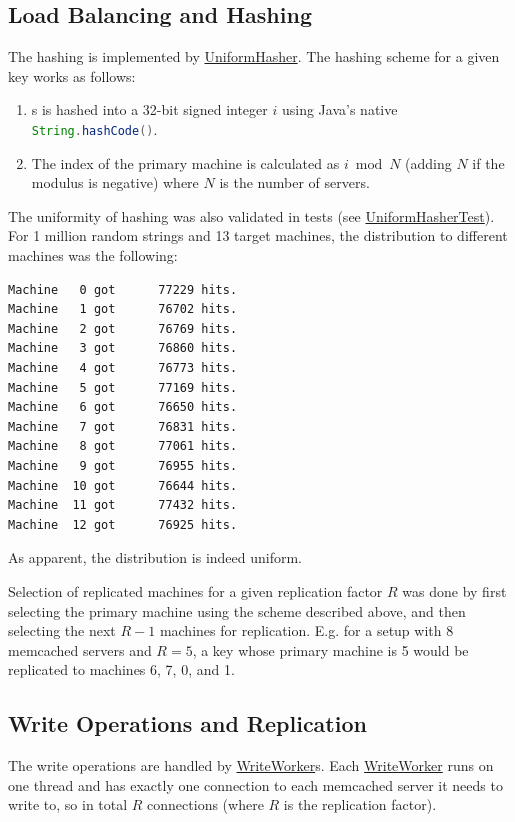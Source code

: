 \documentclass[11pt]{article}
\newcommand{\code}[1]{\lstinline[language=Java]{#1}}
\newcommand{\linkmain}[1]{\href{https://gitlab.inf.ethz.ch/pungast/asl-fall16-project/blob/master/src/main/java/asl/#1.java}{#1}}
\newcommand{\linktest}[1]{\href{https://gitlab.inf.ethz.ch/pungast/asl-fall16-project/blob/master/src/test/java/asl/#1.java}{#1}}
\begin{document}
\subsection{Load Balancing and Hashing}\label{sec:desc:hashing}

The hashing is implemented by \linkmain{UniformHasher}. The hashing scheme for a given key works as follows:
\begin{enumerate}
\item s is hashed into a 32-bit signed integer $i$ using Java's native \code{String.hashCode()}.
\item The index of the primary machine is calculated as $i \bmod N$ (adding $N$ if the modulus is negative) where $N$ is the number of servers.
\end{enumerate}

The uniformity of hashing was also validated in tests (see \linktest{UniformHasherTest}). For 1 million random strings and 13 target machines, the distribution to different machines was the following:

\begin{verbatim}
Machine   0 got      77229 hits.
Machine   1 got      76702 hits.
Machine   2 got      76769 hits.
Machine   3 got      76860 hits.
Machine   4 got      76773 hits.
Machine   5 got      77169 hits.
Machine   6 got      76650 hits.
Machine   7 got      76831 hits.
Machine   8 got      77061 hits.
Machine   9 got      76955 hits.
Machine  10 got      76644 hits.
Machine  11 got      77432 hits.
Machine  12 got      76925 hits.
\end{verbatim}

As apparent, the distribution is indeed uniform.

Selection of replicated machines for a given replication factor $R$ was done by first selecting the primary machine using the scheme described above, and then selecting the next $R-1$ machines for replication. E.g. for a setup with 8 memcached servers and $R=5$, a key whose primary machine is 5 would be replicated to machines 6, 7, 0, and 1.

\subsection{Write Operations and Replication}\label{sec:desc:writes}

The write operations are handled by \linkmain{WriteWorker}s. Each \linkmain{WriteWorker} runs on one thread and has exactly one connection to each memcached server it needs to write to, so in total $R$ connections (where $R$ is the replication factor).
\end{document}
